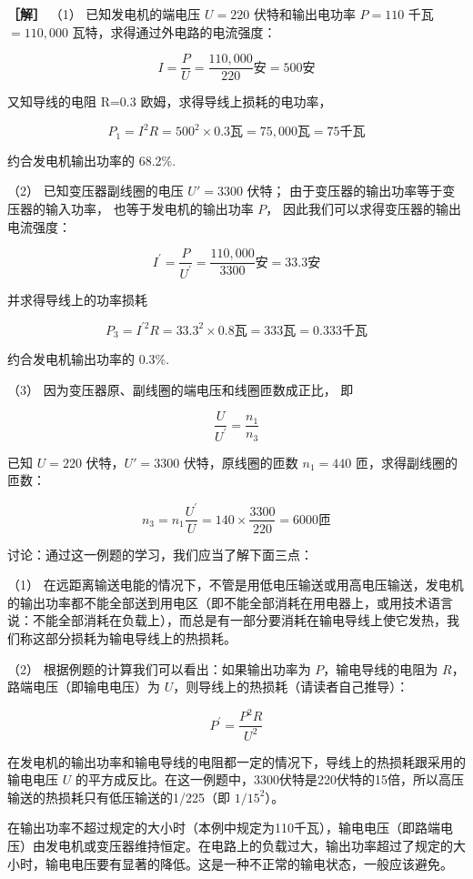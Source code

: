 \textbf{［解］} （1） 已知发电机的端电压 \(U = 220\) 伏特和输出电功率
\(P = 110\) 千瓦 \(= 110,000\) 瓦特，求得通过外电路的电流强度：

\[
I = \frac{P}{U} = \frac{110 , 000}{220} \text{安} = 500 \text{安}
\]

又知导线的电阻 R=0.3 欧姆，求得导线上损耗的电功率，

\[
P_{1} = I^{2} R = 500^{2} \times 0.3 \text{瓦} = 75, 000 \text{瓦} = 75 \text{千瓦}
\]

约合发电机输出功率的 68.2\%.

（2） 已知变压器副线圈的电压 \(U' = 3300\) 伏特；
由于变压器的输出功率等于变压器的输入功率， 也等于发电机的输出功率
\(P\)， 因此我们可以求得变压器的输出电流强度：

\[
I^{\prime} = \frac{P}{U^{\prime}} = \frac{110 , 000}{3300} \text{安} = 33.3 \text{安}
\]

并求得导线上的功率损耗

\[
P_{3} = I^{\prime 2} R = 33.3^{2} \times 0.8 \text{瓦} = 333 \text{瓦} = 0.333 \text{千瓦}
\]

约合发电机输出功率的 0.3\%.

（3） 因为变压器原、副线圈的端电压和线圈匝数成正比， 即

\[
\frac{U}{U^{\prime}} = \frac{n_{1}}{n_{3}}
\]

已知 \(U = 220\) 伏特，\(U' = 3300\) 伏特，原线圈的匝数 \(n_1 = 440\)
匝，求得副线圈的匝数：

\[
n_{3} = n_{1} \frac{U^{\prime}}{U} = 140 \times \frac{3300}{220} = 6000 \text{匝}
\]

讨论：通过这一例题的学习，我们应当了解下面三点：

（1）
在远距离输送电能的情况下，不管是用低电压输送或用高电压输送，发电机的输出功率都不能全部送到用电区（即不能全部消耗在用电器上，或用技术语言说：不能全部消耗在负载上），而总是有一部分要消耗在输电导线上使它发热，我们称这部分损耗为输电导线上的热损耗。

（2） 根据例题的计算我们可以看出：如果输出功率为 \(P\)，输电导线的电阻为
\(R\)，路端电压（即输电电压）为
\(U\)，则导线上的热损耗（请读者自己推导）：

\[
P^{\prime} = \frac{P^{2} R}{U^{2}}
\]

在发电机的输出功率和输电导线的电阻都一定的情况下，导线上的热损耗跟采用的输电电压
\(U\)
的平方成反比。在这一例题中，3300伏特是220伏特的15倍，所以高压输送的热损耗只有低压输送的1/225（即
\(1 / 15^{2}\)）。

在输出功率不超过规定的大小时（本例中规定为110千瓦），输电电压（即路端电压）由发电机或变压器维持恒定。在电路上的负载过大，输出功率超过了规定的大小时，输电电压要有显著的降低。这是一种不正常的输电状态，一般应该避免。

